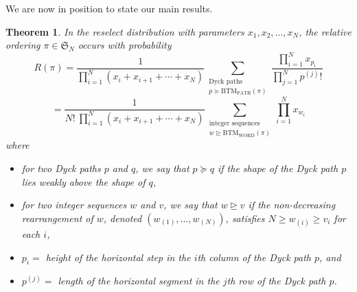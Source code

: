 \documentclass[11pt]{amsart}   %
\newtheorem{theorem}{Theorem}[section]
\theoremstyle{definition}
\theoremstyle{remark}
\numberwithin{equation}{section}
\theoremstyle{theorem}
\renewcommand{\S}{\mathcal{S}}
\renewcommand{\S}{\mathfrak{S}}
\newcommand{\pgeq}{\succcurlyeq}
\begin{document}
We are now in position to state our main results.

\begin{theorem}\label{t:rmain}
In the reselect distribution with parameters $x_1, x_2, \ldots, x_N$, the relative ordering $\pi \in \S_N$ occurs with probability
\[ R(\pi) = \frac{1}{\prod_{i=1}^N (x_i + x_{i+1} + \cdots + x_N)} \sum_{\substack{ \text{Dyck paths }\\ p \pgeq \mathrm{BTM_{PATH}}(\pi)}} \frac{ \prod_{i=1}^N x_{p_i} }{\prod_{j=1}^N p^{(j)}!} \]
\[ = \frac{1}{N! \ \prod_{i=1}^N (x_i + x_{i+1} + \cdots + x_N)} \sum_{\substack{ \text{integer sequences }\\ w \unrhd \mathrm{BTM_{WORD}}(\pi)}} \prod_{i=1}^N x_{w_i} \]
where
\begin{itemize}
\item for two Dyck paths $p$ and $q$, we say that $p \pgeq q$ if the shape of the Dyck path $p$ lies weakly above the shape of $q$,
\item for two integer sequences $w$ and $v$, we say that $w \unrhd v$ if the non-decreasing rearrangement of $w$, denoted $(w_{(1)}, \ldots, w_{(N)})$, satisfies $N \geq w_{(i)} \geq v_i$ for each $i$,
\item $p_i = $ height of the horizontal step in the $i$th column of the Dyck path $p$, and
\item $p^{(j)} = $ length of the horizontal segment in the $j$th row of the Dyck path $p$. %
\end{itemize}
\end{theorem}
\end{document}
